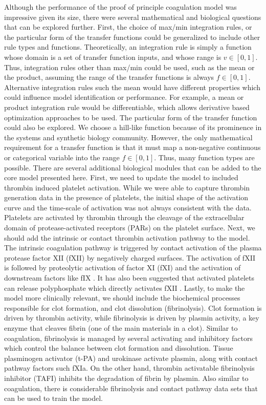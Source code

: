 \documentclass[12pt]{article}
\begin{document}
Although the performance of the proof of principle coagulation model was impressive given its size, there were several mathematical and biological questions that can be explored further.
First, the choice of max/min integration rules, or the particular form of the transfer functions could be generalized to include other rule types and functions. 
Theoretically, an integration rule is simply a function whose domain is a set of transfer function inputs, and whose range is $v\in[0,1]$.
Thus, integration rules other than max/min could be used, such as the mean or the product, assuming the range of the transfer functions is always $f\in[0,1]$.
Alternative integration rules such the mean would have different properties which could influence model identification or performance. 
For example, a mean or product integration rule would be differentiable, which allows derivative based optimization approaches to be used. 
The particular form of the transfer function could also be explored. We choose a hill-like function because of its 
prominence in the systems and synthetic biology community. 
However, the only mathematical requirement for a transfer function is that it must map a non-negative continuous or categorical variable into the 
range $f\in[0,1]$. Thus, many function types are possible.
There are several additional biological modules that can be added to the core model presented here. 
First, we need to update the model to included thrombin induced platelet activation. 
While we were able to capture thrombin generation data in the presence of platelets, 
the initial shape of the activation curve and the time-scale of activation was not always consistent with the data.
Platelets are activated by thrombin through the cleavage of the extracellular domain of protease-activated receptors (PARs) on the platelet surface.
Next, we should add the intrinsic or contact thrombin activation pathway to the model. 
The intrinsic coagulation pathway is triggered by contact activation of the plasma protease factor XII (fXII) by negatively charged surfaces.
The activation of fXII is followed by proteolytic activation of factor XI (fXI) and the activation of downstream factors like fIX \cite{NAITO1991}.
It has also been suggested that activated platelets can release polyphosphate which directly activates fXII \cite{Smith:2006zl}. 
Lastly, to make the model more clinically relevant, we should include the biochemical processes responsible for clot formation, and clot dissolution (fibrinolysis).
Clot formation is driven by thrombin activity, while fibrinolysis is driven by plasmin activity, a key enzyme that cleaves fibrin (one of the main materials in a clot).
Similar to coagulation, fibrinolysis is managed by several activating and inhibitory factors which control the balance between clot formation and dissolution.
Tissue plasminogen activator (t-PA) and urokinase activate plasmin, along with contact pathway factors such fXIa. On the other hand, thrombin activatable fibrinolysis inhibitor (TAFI)
inhibits the degradation of fibrin by plasmin. Also similar to coagulation, there is considerable fibrinolysis and contact pathway data sets that can be used to train the model.
\end{document}
